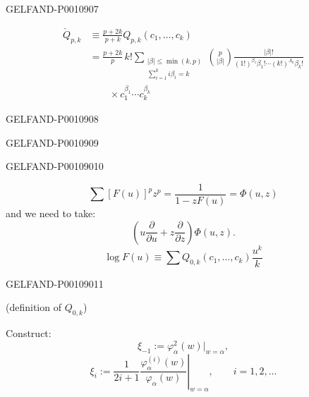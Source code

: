 \begin{GelfandAdjacentEvidence}{GELFAND-P001090}{7}


\begin{equation*}
\begin{aligned}
\widehat Q_{p,k}
&\equiv\frac{p+2k}{p+k}Q_{p,k}(c_1,\ldots,c_k)\\
&=\frac{p+2k}{p}\,k!
\sum_{\substack{\lvert\beta\rvert\le\min(k,p)\\\sum_{i=1}^k i\beta_i=k}}
\binom{p}{\lvert\beta\rvert}
\frac{\lvert\beta\rvert!}{(1!)^{\beta_1}\beta_1!\cdots(k!)^{\Lambda_k}\beta_k!}\\
&\qquad{}\times c_1^{\beta_1}\cdots c_k^{\beta_k}
\end{aligned}
\tag{7}
\end{equation*}
\end{GelfandAdjacentEvidence}
\begin{GelfandAdjacentEvidence}{GELFAND-P001090}{8}

\end{GelfandAdjacentEvidence}
\begin{GelfandAdjacentEvidence}{GELFAND-P001090}{9}

\end{GelfandAdjacentEvidence}
\begin{GelfandAdjacentEvidence}{GELFAND-P001090}{10}

\[
\sum[F(u)]^p z^p=\frac{1}{1-zF(u)}=\Phi(u,z)
\]
and we need to take:
\[
\left(u\frac{\partial}{\partial u}+z\frac{\partial}{\partial z}\right)\Phi(u,z).
\]
\begin{equation*}
\log F(u)\equiv\sum Q_{0,k}(c_1,\ldots,c_k)\frac{u^k}{k}
\tag{8}
\end{equation*}
\end{GelfandAdjacentEvidence}
\begin{GelfandAdjacentEvidence}{GELFAND-P001090}{11}

(definition of $Q_{0,k}$)

Construct:
\begin{equation*}
\xi_{-1}:=\varphi_\alpha^2(w)\big|_{w=\alpha},
\tag{9}
\end{equation*}
\begin{equation*}
\xi_i:=\frac{1}{2i+1}
\left.\frac{\varphi_\alpha^{(i)}(w)}{\varphi_\alpha(w)}\right|_{w=\alpha},
\qquad i=1,2,\ldots
\tag{10}
\end{equation*}
\end{GelfandAdjacentEvidence}



